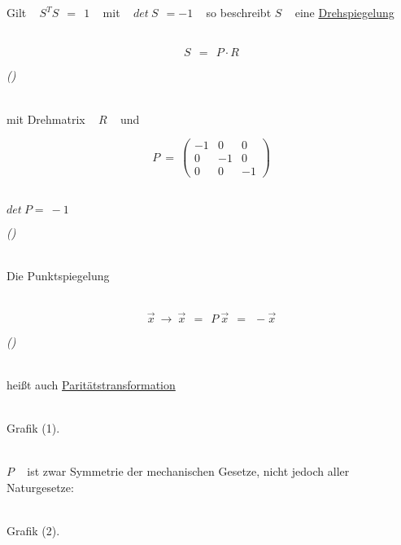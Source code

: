 \documentclass{scrreprt}
\newcounter{ec} %
\newcommand{\iec}{\addtocounter{ec}{1}\begin{flushright}\textit{(\arabic{ec})}\end{flushright}}
\begin{document}
	~\\ %
	
	~\\
	
	Gilt ~ $S^TS ~~ = ~~ 1$ ~ mit ~ $det ~ S ~~ = -1$ ~ so beschreibt $S$ ~ eine \underline{Drehspiegelung}
	
	~\\
	
	\[ S ~~ = ~~ P \cdot R \]
	
	\iec
	
	~\\
	
	mit Drehmatrix ~ $R$ ~ und ~ 
	
	\[P ~ = ~ \left(\begin{array}{ccc}
	-1 & 0 & 0 \\ 
	0 & -1 & 0 \\ 
	0 & 0 & -1
	\end{array}\right) \]
	
	~\\
	
	$det ~ P = ~ -1$
	
	\iec
	
	~\\
	
	Die Punktspiegelung
	
	~\\
	
	\[ \vec{x} ~ \rightarrow ~ \vec{x} ~~ = ~~ P ~ \vec{x} ~~ = ~~ -\vec{x} \]
	
	\iec
	
	~\\
	
	heißt auch \underline{Paritätstransformation}
	
	~\\
	
	Grafik (1).
	
	~\\
	
	$P$ ~ ist zwar Symmetrie der mechanischen Gesetze, nicht jedoch aller Naturgesetze:
	
	~\\
	
	Grafik (2).
	
	~\\
	
	
	\newpage
	
\end{document}
